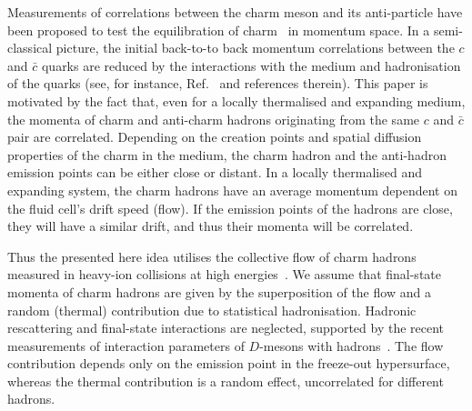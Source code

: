 \documentclass[floatfix,superscriptaddress,a4paper,
               showpieces,showkeys,nofootinbib,preprint]{revtex4-2}
\begin{document}
Measurements of correlations between the charm meson and its anti-particle have been proposed to test the equilibration of charm~\cite{Zhu:2006er,Cao:2015cba} in momentum space. In a semi-classical picture, the initial back-to-to back momentum correlations between the $c$ and $\bar c$ quarks are reduced by the interactions with the medium and
hadronisation of the quarks (see, for instance, Ref.~\cite{He_2020} and references therein).
This paper is motivated by the fact that, even for a locally thermalised and expanding medium, the momenta of charm and anti-charm hadrons originating from the same $c$ and $\bar{c}$ pair are correlated. 
Depending on the creation points and spatial diffusion properties of the charm in the medium, the charm hadron and the anti-hadron emission points can be either close or distant. In a locally thermalised and expanding system, the charm hadrons have an average momentum dependent on the fluid cell's drift speed (flow). If the emission points of the hadrons are close, they will have a similar drift, and thus their momenta will be correlated. 


Thus the presented here idea
utilises the collective flow of charm hadrons measured
in heavy-ion collisions at 
high energies~\cite{STAR:D0:v1,STAR:D0:v2,STAR:eHF:v2:2014yia,ALICE:D0:v2,ALICE:D0:v2:2013,ALICE:eHF:v2,ALICE:D:v2:2020iug,ATLAS:muHF:v2:2018ofq,ALICE:D:v2:2017pbx,ALICE:beauty:v2:2020hdw,PHENIX:eHF:v2}. We assume that final-state momenta of charm
hadrons are given by the superposition of the flow and a random (thermal) contribution due to statistical hadronisation. Hadronic rescattering 
and final-state interactions are neglected, supported by the recent measurements of interaction parameters of $D$-mesons with hadrons~\cite{ALICE:2022enj,QM2022:ALICE:D:hadron:femotscopy}. The flow contribution depends only on the emission point in the freeze-out hypersurface, whereas the thermal contribution is a random effect, uncorrelated for different hadrons.
\end{document}
